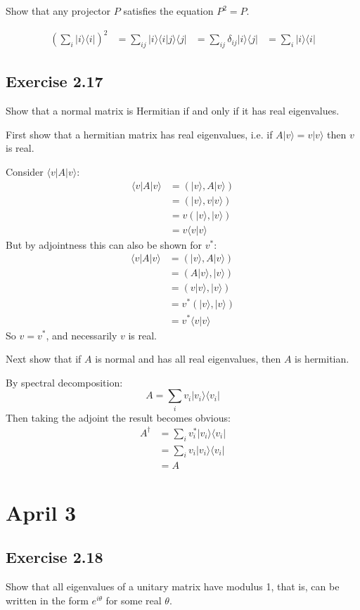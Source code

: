 \documentclass[]{article}
\newcommand{\bra}[1]{\langle #1 |}
\newcommand{\ket}[1]{| #1 \rangle}
\newcommand{\braket}[2]{\langle #1 | #2 \rangle}
\begin{document}
Show that any projector $P$ satisfies the equation $P^2 = P$.

\begin{align*}
	(\sum_i \ket{i}\bra{i})^2
	&= \sum_{ij} \ket{i}\braket{i}{j}\bra{j}
	&= \sum_{ij} \delta_{ij}\ket{i}\bra{j}
	&= \sum_i \ket{i}\bra{i}
\end{align*}

\subsection{Exercise 2.17}
Show that a normal matrix is Hermitian if and only if it has real eigenvalues.

First show that a hermitian matrix has real eigenvalues, i.e. if
$A\ket{v} = v\ket{v}$ then $v$ is real.

Consider $\bra{v}A\ket{v}$:
\begin{align*}
	\bra{v}A\ket{v}
	&= (\ket{v}, A\ket{v}) \\
	&= (\ket{v}, v\ket{v}) \\
	&= v(\ket{v}, \ket{v}) \\
&= v\braket{v}{v}
\end{align*}
But by adjointness this can also be shown for $v^*$:
\begin{align*}
	\bra{v}A\ket{v}
	&= (\ket{v}, A\ket{v}) \\
	&= (A\ket{v}, \ket{v}) \\
	&= (v\ket{v}, \ket{v}) \\
	&= v^*(\ket{v}, \ket{v}) \\
&= v^*\braket{v}{v}
\end{align*}
So $v = v^*$, and necessarily $v$ is real.

Next show that if $A$ is normal and has all real eigenvalues, then $A$ is hermitian.

By spectral decomposition:
\[A = \sum_i v_i\ket{v_i}\bra{v_i}\]
Then taking the adjoint the result becomes obvious:
\begin{align*}
A^\dagger
	&= \sum_i v_i^* \ket{v_i}\bra{v_i} \\
	&= \sum_i v_i \ket{v_i}\bra{v_i} \\
&= A
\end{align*}

\section{April 3}

\subsection{Exercise 2.18}
Show that all eigenvalues of a unitary matrix have modulus 1, that is, can be written in the form $e^{i\theta}$ for some real $\theta$.
\end{document}
